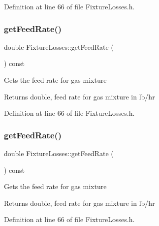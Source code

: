 Definition at line 66 of file Fixture\+Losses.\+h.

\mbox{\label{class_fixture_losses_a09707af8de4b304c65f4aeb1130ea44e}} 
\subsubsection{\texorpdfstring{get\+Feed\+Rate()}{getFeedRate()}\hspace{0.1cm}{\footnotesize\ttfamily [2/3]}}
{\footnotesize\ttfamily double Fixture\+Losses\+::get\+Feed\+Rate (\begin{DoxyParamCaption}{ }\end{DoxyParamCaption}) const\hspace{0.3cm}{\ttfamily [inline]}}

Gets the feed rate for gas mixture \begin{DoxyReturn}{Returns}
double, feed rate for gas mixture in lb/hr 
\end{DoxyReturn}


Definition at line 66 of file Fixture\+Losses.\+h.

\mbox{\label{class_fixture_losses_a09707af8de4b304c65f4aeb1130ea44e}} 
\subsubsection{\texorpdfstring{get\+Feed\+Rate()}{getFeedRate()}\hspace{0.1cm}{\footnotesize\ttfamily [3/3]}}
{\footnotesize\ttfamily double Fixture\+Losses\+::get\+Feed\+Rate (\begin{DoxyParamCaption}{ }\end{DoxyParamCaption}) const\hspace{0.3cm}{\ttfamily [inline]}}

Gets the feed rate for gas mixture \begin{DoxyReturn}{Returns}
double, feed rate for gas mixture in lb/hr 
\end{DoxyReturn}


Definition at line 66 of file Fixture\+Losses.\+h.

